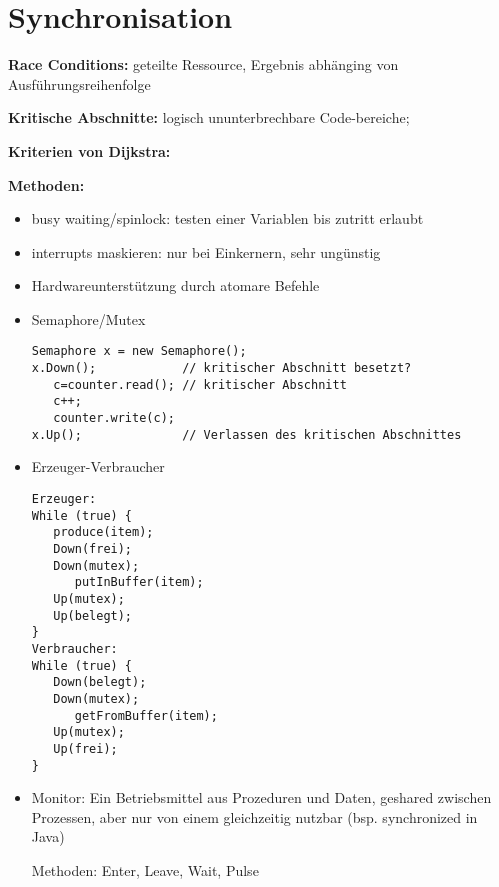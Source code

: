 \section{Synchronisation}
\textbf{Race Conditions:} geteilte Ressource, Ergebnis abhänging von Ausführungsreihenfolge

\textbf{Kritische Abschnitte:} logisch ununterbrechbare Code-bereiche;

\textbf{Kriterien von Dijkstra: }



\textbf{Methoden:}
\begin{itemize}
\item busy waiting/spinlock: testen einer Variablen bis zutritt erlaubt
\item interrupts maskieren: nur bei Einkernern, sehr ungünstig
\item Hardwareunterstützung durch atomare Befehle
\item Semaphore/Mutex
\begin{verbatim}
Semaphore x = new Semaphore();
x.Down();            // kritischer Abschnitt besetzt?
   c=counter.read(); // kritischer Abschnitt
   c++;
   counter.write(c);
x.Up();              // Verlassen des kritischen Abschnittes
\end{verbatim}
\item Erzeuger-Verbraucher
\begin{multicols}{2}
\begin{verbatim}
Erzeuger:
While (true) {
   produce(item);
   Down(frei);
   Down(mutex);
      putInBuffer(item);
   Up(mutex);
   Up(belegt);
}
Verbraucher:
While (true) {
   Down(belegt);
   Down(mutex);
      getFromBuffer(item);
   Up(mutex);
   Up(frei);
}
\end{verbatim}
\end{multicols}

\item Monitor: Ein Betriebsmittel aus Prozeduren und Daten, geshared zwischen Prozessen, aber nur von einem gleichzeitig nutzbar (bsp. synchronized in Java)

Methoden: Enter, Leave, Wait, Pulse
\end{itemize}



